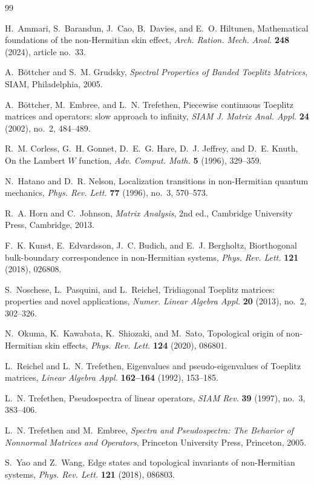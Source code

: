 \documentclass[11pt]{amsart}
\numberwithin{equation}{section}
\begin{document}
\begin{thebibliography}{99}

H.~Ammari, S.~Barandun, J.~Cao, B.~Davies, and E.~O. Hiltunen,
Mathematical foundations of the non-Hermitian skin effect,
\emph{Arch. Ration. Mech. Anal.} \textbf{248} (2024), article no.~33.

A.~B\"ottcher and S.~M. Grudsky,
\emph{Spectral Properties of Banded Toeplitz Matrices},
SIAM, Philadelphia, 2005.

A.~B\"ottcher, M.~Embree, and L.~N. Trefethen,
Piecewise continuous Toeplitz matrices and operators: slow approach to infinity,
\emph{SIAM J. Matrix Anal. Appl.} \textbf{24} (2002), no.~2, 484--489.

R.~M. Corless, G.~H. Gonnet, D.~E.~G. Hare, D.~J. Jeffrey, and D.~E. Knuth,
On the Lambert \(W\) function,
\emph{Adv. Comput. Math.} \textbf{5} (1996), 329--359.

N.~Hatano and D.~R. Nelson,
Localization transitions in non-Hermitian quantum mechanics,
\emph{Phys. Rev. Lett.} \textbf{77} (1996), no.~3, 570--573.

R.~A. Horn and C.~Johnson,
\emph{Matrix Analysis},
2nd ed.,
Cambridge University Press, Cambridge, 2013.

F.~K. Kunst, E.~Edvardsson, J.~C. Budich, and E.~J. Bergholtz,
Biorthogonal bulk-boundary correspondence in non-Hermitian systems,
\emph{Phys. Rev. Lett.} \textbf{121} (2018), 026808.

S.~Noschese, L.~Pasquini, and L.~Reichel,
Tridiagonal Toeplitz matrices: properties and novel applications,
\emph{Numer. Linear Algebra Appl.} \textbf{20} (2013), no.~2, 302--326.

N.~Okuma, K.~Kawabata, K.~Shiozaki, and M.~Sato,
Topological origin of non-Hermitian skin effects,
\emph{Phys. Rev. Lett.} \textbf{124} (2020), 086801.

L.~Reichel and L.~N. Trefethen,
Eigenvalues and pseudo-eigenvalues of Toeplitz matrices,
\emph{Linear Algebra Appl.} \textbf{162--164} (1992), 153--185.

L.~N. Trefethen,
Pseudospectra of linear operators,
\emph{SIAM Rev.} \textbf{39} (1997), no.~3, 383--406.

L.~N. Trefethen and M.~Embree,
\emph{Spectra and Pseudospectra: The Behavior of Nonnormal Matrices and Operators},
Princeton University Press, Princeton, 2005.

S.~Yao and Z.~Wang,
Edge states and topological invariants of non-Hermitian systems,
\emph{Phys. Rev. Lett.} \textbf{121} (2018), 086803.

\end{thebibliography}
\end{document}
